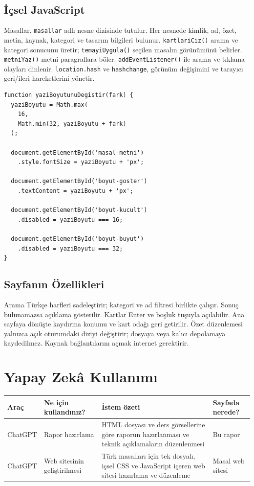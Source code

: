 \documentclass[12pt,a4paper]{article}
\begin{document}
\subsection{İçsel JavaScript}
Masallar, \texttt{masallar} adlı nesne dizisinde tutulur. Her nesnede kimlik, ad, özet, metin, kaynak, kategori ve tasarım bilgileri bulunur. \texttt{kartlariCiz()} arama ve kategori sonucunu üretir; \texttt{temayiUygula()} seçilen masalın görünümünü belirler. \texttt{metniYaz()} metni paragraflara böler. \texttt{addEventListener()} ile arama ve tıklama olayları dinlenir. \texttt{location.hash} ve \texttt{hashchange}, görünüm değişimini ve tarayıcı geri/ileri hareketlerini yönetir.

\begin{lstlisting}[caption={İçsel JavaScript'ten önemli bir bölüm}]
function yaziBoyutunuDegistir(fark) {
  yaziBoyutu = Math.max(
    16,
    Math.min(32, yaziBoyutu + fark)
  );

  document.getElementById('masal-metni')
    .style.fontSize = yaziBoyutu + 'px';

  document.getElementById('boyut-goster')
    .textContent = yaziBoyutu + 'px';

  document.getElementById('boyut-kucult')
    .disabled = yaziBoyutu === 16;

  document.getElementById('boyut-buyut')
    .disabled = yaziBoyutu === 32;
}
\end{lstlisting}

\subsection{Sayfanın Özellikleri}
Arama Türkçe harfleri sadeleştirir; kategori ve ad filtresi birlikte çalışır. Sonuç bulunamazsa açıklama gösterilir. Kartlar Enter ve boşluk tuşuyla açılabilir. Ana sayfaya dönüşte kaydırma konumu ve kart odağı geri getirilir. Özet düzenlemesi yalnızca açık oturumdaki diziyi değiştirir; dosyaya veya kalıcı depolamaya kaydedilmez. Kaynak bağlantılarını açmak internet gerektirir.

\section{Yapay Zekâ Kullanımı}
\begin{longtable}{@{}p{2cm}p{3.2cm}p{5.2cm}p{2.6cm}@{}}
\toprule
\textbf{Araç} & \textbf{Ne için kullandınız?} & \textbf{İstem özeti} & \textbf{Sayfada nerede?}\\
\midrule
\endhead
ChatGPT & Rapor hazırlama & HTML dosyası ve ders görsellerine göre raporun hazırlanması ve teknik açıklamaların düzenlenmesi & Bu rapor\\
ChatGPT & Web sitesinin geliştirilmesi & Türk masalları için tek dosyalı, içsel CSS ve JavaScript içeren web sitesi hazırlama ve düzenleme & Masal web sitesi\\

\end{longtable}
\end{document}

